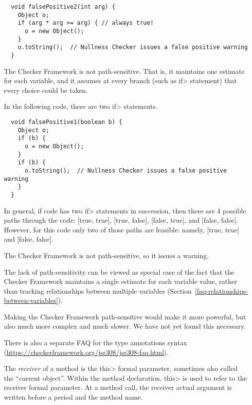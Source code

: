 \begin{Verbatim}
  void falsePositive2(int arg) {
    Object o;
    if (arg * arg >= arg) { // always true!
      o = new Object();
    }
    o.toString();  // Nullness Checker issues a false positive warning
  }
\end{Verbatim}



The Checker Framework is not path-sensitive.  That is, it maintains one
estimate for each variable, and it assumes at every branch (such as \<if>
statement) that every choice could be taken.

In the following code, there are two \<if> statements.

\begin{Verbatim}
  void falsePositive1(boolean b) {
    Object o;
    if (b) {
      o = new Object();
    }
    if (b) {
      o.toString();  // Nullness Checker issues a false positive warning
    }
  }
\end{Verbatim}

In general, if code has two \<if> statements in succession, then there are
4 possible paths through the code:  [true, true], [true, false], [false,
  true], and [false, false].  However, for this code only two of those
paths are feasible:  namely, [true, true] and [false, false].

The Checker Framework is not path-sensitive, so it issues a warning.

The lack of path-sensitivity can be viewed as special case of the fact that
the Checker Framework maintains a single estimate for each variable value,
rather than tracking relationships between multiple variables
(Section~\ref{faq-relationships-between-variables}).

Making the Checker Framework path-sensitive would make it more powerful,
but also much more complex and much slower.  We have not yet found this
necessary.



There is also a separate FAQ for the type annotations syntax
(\url{https://checkerframework.org/jsr308/jsr308-faq.html}).



The \emph{receiver} of a method is the \<this> formal parameter, sometimes
also called the ``current object''.  Within the method declaration, \<this>
is used to refer to the receiver formal parameter.  At a method call, the
receiver actual argument is written before a period and the method name.

